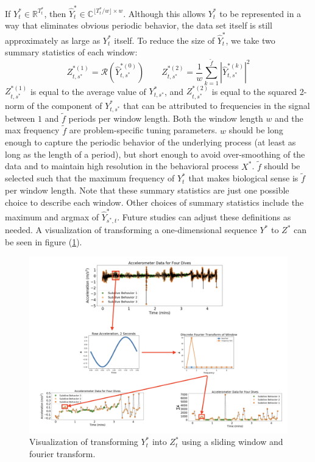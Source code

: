 If $Y^*_t \in \mathbb{R}^{T^*_t}$, then $\hat{Y}_t^* \in \mathbb{C}^{\lfloor T^*_t / w \rfloor \times w}$. Although this allows $Y^*_t$ to be represented in a way that eliminates obvious periodic behavior, the data set itself is still approximately as large as $Y^*_t$ itself. To reduce the size of $\hat{Y}^*_t$, we take two summary statistics of each window:
%
$$Z_{t,s^*}^{*(1)} = \mathcal{R}\left(\hat{Y}^{*(0)}_{t,s^*}\right) \qquad Z_{t,s^*}^{*(2)} = \frac{1}{w}\sum_{k=1}^{\tilde{f}}|\hat{Y}^{*(k)}_{t,s^*}|^2$$
%
$Z_{t,s^*}^{*(1)}$ is equal to the average value of $Y_{t,s^*}^*$, and $Z_{t,s^*}^{*(2)}$ is equal to the squared 2-norm of the component of $Y_{t,s^*}^*$ that can be attributed to frequencies in the signal between $1$ and $\tilde{f}$ periods per window length. Both the window length $w$ and the max frequency $\tilde{f}$ are problem-specific tuning parameters. $w$ should be long enough to capture the periodic behavior of the underlying process (at least as long as the length of a period), but short enough to avoid over-smoothing of the data and to maintain high resolution in the behavioral process $X^*$. $\tilde{f}$ should be selected such that the maximum frequency of $Y_t^*$ that makes biological sense is $\tilde{f}$ per window length. Note that these summary statistics are just one possible choice to describe each window. Other choices of summary statistics include the maximum and argmax of $\hat Y^*_{s^*,t}$. Future studies can adjust these definitions as needed. A visualization of transforming a one-dimensional sequence $Y^*$ to $Z^*$ can be seen in figure (\ref{fig:fourier_example}).

\begin{figure}[h!]
	\centering
	\includegraphics[width=5in]{../Plots/fourier_transform.png}
	\caption{Visualization of transforming $Y^*_t$ into $Z^*_t$ using a sliding window and fourier transform.}
	\label{fig:fourier_example}
\end{figure}

